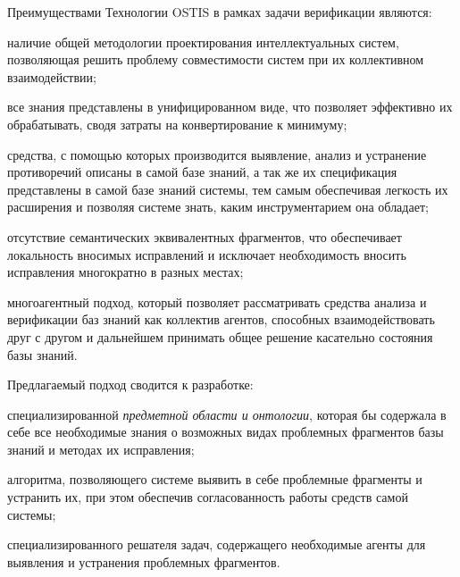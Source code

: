 Преимуществами Технологии OSTIS в рамках задачи верификации являются:
\begin{textitemize}
    \item наличие общей методологии проектирования интеллектуальных систем, позволяющая решить проблему совместимости систем при их коллективном взаимодействии;
    \item все знания представлены в унифицированном виде, что позволяет эффективно их обрабатывать, сводя затраты на конвертирование к минимуму;
   \item средства, с помощью которых производится выявление, анализ и устранение противоречий описаны в самой базе знаний, а так же их спецификация представлены в самой базе знаний системы, тем самым обеспечивая легкость их расширения и позволяя системе знать, каким инструментарием она обладает;
   \item отсутствие семантических эквивалентных фрагментов, что обеспечивает локальность вносимых исправлений и исключает необходимость вносить исправления многократно в разных местах;
   \item многоагентный подход, который позволяет рассматривать средства анализа и верификации баз знаний как коллектив агентов, способных взаимодействовать друг с другом и дальнейшем принимать общее решение касательно состояния базы знаний. 
\end{textitemize}

Предлагаемый подход сводится к разработке:
\begin{textitemize}
    \item специализированной \textit{предметной области и онтологии}, которая бы содержала в себе все необходимые знания о возможных видах проблемных фрагментов базы знаний и методах их исправления;
    \item алгоритма, позволяющего системе выявить в себе проблемные фрагменты и устранить их, при этом обеспечив согласованность работы средств самой системы;
    \item специализированного решателя задач, содержащего необходимые агенты для выявления и устранения проблемных фрагментов.
\end{textitemize}

